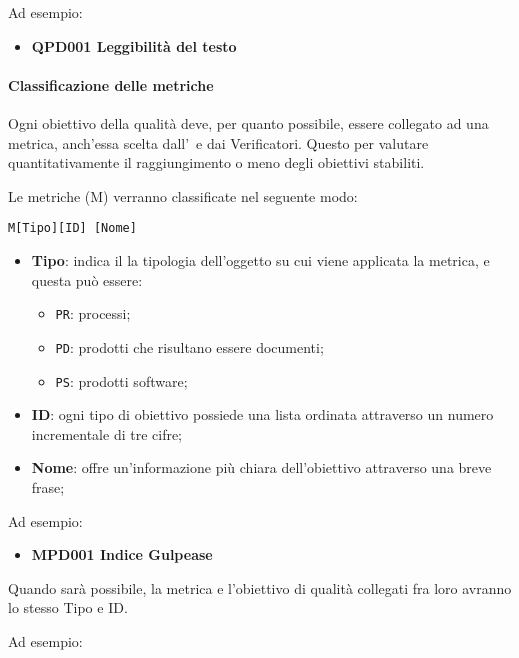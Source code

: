 			Ad esempio:

			\begin{itemize}
				\item \textbf{QPD001 Leggibilità del testo}
			\end{itemize}


			\paragraph{Classificazione delle metriche}\label{Classificazione metriche}
			Ogni obiettivo della qualità deve, per quanto possibile, essere collegato ad una metrica, anch'essa scelta dall'\Amm\ e dai Verificatori. Questo per valutare
			quantitativamente il raggiungimento o meno degli obiettivi stabiliti.

			Le metriche (M) verranno classificate nel seguente modo:

			\begin{center}
				\texttt{M[Tipo][ID] [Nome]}
			\end{center}

			\begin{itemize}
				\item \textbf{Tipo}: indica il la tipologia dell'oggetto su cui viene applicata la metrica, e questa può essere:
				\begin{itemize}
					\item \texttt{PR}: processi;
					\item \texttt{PD}: prodotti che risultano essere documenti;
					\item \texttt{PS}: prodotti software;
				\end{itemize}

				\item \textbf{ID}: ogni tipo di obiettivo possiede una lista ordinata attraverso un numero incrementale di tre cifre;
				\item \textbf{Nome}: offre un'informazione più chiara dell'obiettivo attraverso una breve frase;
			\end{itemize}

			Ad esempio:

			\begin{itemize}
				\item \textbf{MPD001 Indice Gulpease}
			\end{itemize}

			Quando sarà possibile, la metrica e l'obiettivo di qualità collegati fra loro avranno lo stesso Tipo e ID.

			Ad esempio:

